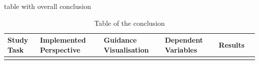 table with overall conclusion
\begin{table}[H]
	\begin{tabular}{|l|l|l|l|l|l|}
		\hline
		Study Task & Implemented Perspective & Guidance Visualisation & Dependent Variables & Results & \\ \hline
		&  &  &  &  & \\ \hline
	\end{tabular}
	\caption{Table of the conclusion}
\end{table}

